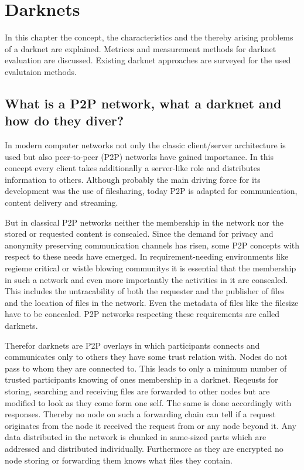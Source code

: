 \chapter{Darknets}

In this chapter the concept, the characteristics and the thereby arising problems of a darknet are explained. Metrices and measurement methods for darknet evaluation are discussed. Existing darknet approaches are surveyed for the used evalutaion methods. 

\section{What is a P2P network, what a darknet and how do they diver?}

In modern computer networks not only the classic client/server architecture is used but also peer-to-peer (P2P) networks have gained importance. In this concept every client takes additionally a server-like role and distributes information to others. Although probably the main driving force for its development was the use of filesharing, today P2P is adapted for communication, content delivery and streaming.

But in classical P2P networks neither the membership in the network nor the stored or requested content is consealed. Since the demand for privacy and anonymity preserving communication channels has risen, some P2P concepts with respect to these needs have emerged. In requirement-needing environments like regieme critical or wistle blowing communitys it is essential that the membership in such a network and even more importantly the activities in it are consealed. This includes the untracability of both the requester and the publisher of files and the location of files in the network. Even the metadata of files like the filesize have to be concealed. P2P networks respecting these requirements are called darknets.

Therefor darknets are P2P overlays in which participants connects and communicates only to others they have some trust relation with. Nodes do not pass to whom they are connected to. This leads to only a minimum number of trusted participants knowing of ones membership in a darknet. Reqeusts for storing, searching and receiving files are forwarded to other nodes but are modified to look as they come form one self. The same is done accordingly with responses. Thereby no node on such a forwarding chain can tell if a request originates from the node it received the request from or any node beyond it. Any data distributed in the network is chunked in same-sized parts which are addressed and distributed individually. Furthermore as they are encrypted no node storing or forwarding them knows what files they contain.



